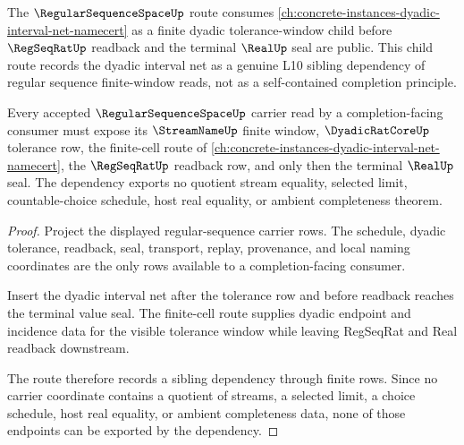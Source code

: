 The $\RegularSequenceSpaceUp$ route consumes \autoref{ch:concrete-instances-dyadic-interval-net-namecert} as a finite dyadic tolerance-window child before $\RegSeqRatUp$ readback and the terminal $\RealUp$ seal are public. This child route records the dyadic interval net as a genuine L10 sibling dependency of regular sequence finite-window reads, not as a self-contained completion principle.

\begin{proposition}
\label{thm:regular-sequence-space-dyadic-net-dependency}
Every accepted $\RegularSequenceSpaceUp$ carrier read by a completion-facing consumer must expose its $\StreamNameUp$ finite window, $\DyadicRatCoreUp$ tolerance row, the finite-cell route of \autoref{ch:concrete-instances-dyadic-interval-net-namecert}, the $\RegSeqRatUp$ readback row, and only then the terminal $\RealUp$ seal. The dependency exports no quotient stream equality, selected limit, countable-choice schedule, host real equality, or ambient completeness theorem.
\end{proposition}
\begin{proof}
Project the displayed regular-sequence carrier rows. The schedule, dyadic tolerance, readback, seal, transport, replay, provenance, and local naming coordinates are the only rows available to a completion-facing consumer.

Insert the dyadic interval net after the tolerance row and before readback reaches the terminal value seal. The finite-cell route supplies dyadic endpoint and incidence data for the visible tolerance window while leaving RegSeqRat and Real readback downstream.

The route therefore records a sibling dependency through finite rows. Since no carrier coordinate contains a quotient of streams, a selected limit, a choice schedule, host real equality, or ambient completeness data, none of those endpoints can be exported by the dependency.
\end{proof}
